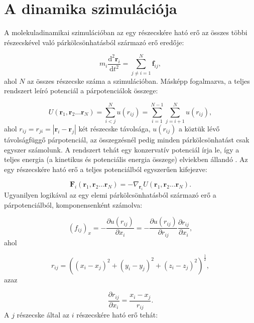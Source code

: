 \documentclass[12pt]{article}
\theoremstyle{plain}
\newcommand{\dd}{\textrm{d}}
\begin{document}
\section{A dinamika szimulációja}

A molekuladinamikai szimulációban az egy részecskére ható erő az összes többi részecskével való párkölcsönhatásból származó erő eredője:

\begin{equation}
	m_i \frac{\dd^2 \mathbf{r}_i}{\dd t^2} = \sum_{j \neq i =1}^{N} \mathbf{f}_{ij},
\end{equation}
ahol $N$ az összes részecske száma a szimulációban. Másképp fogalmazva, a teljes rendszert leíró potenciál a párpotenciálok összege:

\begin{equation}
	U(\mathbf{r}_1, \mathbf{r}_2 \dots \mathbf{r}_N) = \sum_{i<j}^N u(r_{ij}) = 
	\sum_{i=1}^{N-1} \sum_{j=i+1}^{N} u(r_{ij}),
\end{equation}
ahol $r_{ij} = r_{ji} = |\mathbf{r}_i - \mathbf{r}_j|$ két részecske távolsága, $u(r_{ij})$ a köztük lévő távolságfüggő párpotenciál, az összegzésnél pedig minden párkölcsönhatást csak egyszer számolunk. A rendszert tehát egy konzervatív potenciál írja le, így a teljes energia (a kinetikus és potenciális energia összege) elviekben állandó \cite{Landau2012}. Az egy részecskére ható erő a teljes potenciálból egyszerűen kifejezve:

\begin{equation}
	\mathbf{F}_i (\mathbf{r}_1, \mathbf{r}_2 \dots \mathbf{r}_N) = -\nabla_{\mathbf{r}_i} U(\mathbf{r}_1, \mathbf{r}_2 \dots \mathbf{r}_N).
\end{equation}
Ugyanilyen logikával az egy elemi párkölcsönhatásból származó erő a párpotenciálból, komponensenként számolva:

\begin{equation}
	(f_{ij})_x = -\frac{\partial u(r_{ij})}{\partial x_i} = -\frac{\partial u(r_{ij})}{\partial r_{ij}} \frac{\partial r_{ij}}{\partial x_i},
\end{equation}
ahol 

\begin{equation}
	r_{ij} = ( (x_i - x_j)^2 + (y_i - y_j)^2 + (z_i - z_j)^2 )^{\frac{1}{2}},
\end{equation}
azaz

\begin{equation}
	\frac{\partial r_{ij}}{\partial x_i} = \frac{x_i - x_j}{r_{ij}}.
\end{equation}
A $j$ részecske által az $i$ részecskére ható erő tehát:
\end{document}
